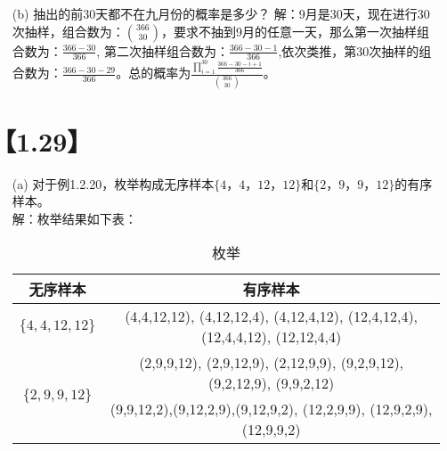 \documentclass [12pt]{article}
\begin{document}
\begin{CJK*}{GBK}{kai}
\begin{enumerate}
  \item[(b)]  抽出的前30天都不在九月份的概率是多少？
  解：9月是30天，现在进行30次抽样，组合数为：${366 \choose 30}$，要求不抽到9月的任意一天，那么第一次抽样组合数为：$\frac{366-30}{366}$, 第二次抽样组合数为：$\frac{366-30-1}{366}$,依次类推，第30次抽样的组合数为：$\frac{366-30-29}{366}$。总的概率为$\frac{\prod\limits_{i=1}^{30}{\frac{366-30-i+1}{366}}}{{366 \choose 30}}$。
  
 \end{enumerate}  

\section{【1.29】}
\begin{enumerate}
  \item[(a)]  对于例1.2.20，枚举构成无序样本$\{4，4，12，12\}$和$\{2，9，9，12\}$的有序样本。\\
  解：枚举结果如下表：
  \begin{table}[htbp]
\caption{枚举}
\begin{center}
\begin{tabular}{|c|c|}
\hline %
无序样本  &  有序样本 \\
\hline
$\{4,4,12,12\} $ & (4,4,12,12), (4,12,12,4), (4,12,4,12), (12,4,12,4), (12,4,4,12), (12,12,4,4)\\
\hline
\multirow{2}{*}{$\{2,9,9,12\}$} & (2,9,9,12), (2,9,12,9), (2,12,9,9), (9,2,9,12),(9,2,12,9), (9,9,2,12)\\
 & {(9,9,12,2),(9,12,2,9),(9,12,9,2), (12,2,9,9), (12,9,2,9), (12,9,9,2)}\\
\hline
\end{tabular}
\end{center}
\label{default}
\end{table}%


\end{enumerate}
\end{CJK*}
\end{document}
